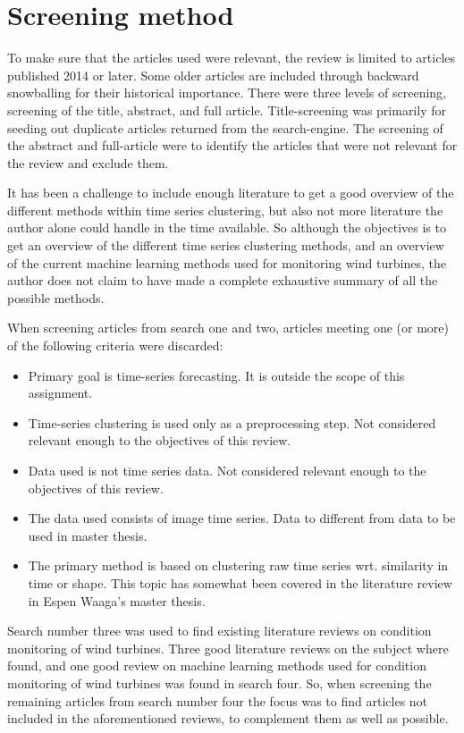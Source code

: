\section{Screening method}
To make sure that the articles used were relevant, the review is limited to articles published 2014 or later. Some older articles are included through backward snowballing for their historical importance. There were three levels of screening, screening of the title, abstract, and full article. Title-screening was primarily for seeding out duplicate articles returned from the search-engine. The screening of the abstract and full-article were to identify the articles that were not relevant for the review and exclude them. \bigskip

It has been a challenge to include enough literature to get a good overview of the different methods within time series clustering, but also not more literature the author alone could handle in the time available. So although the objectives is to get an overview of the different time series clustering methods, and an overview of the current machine learning methods used for monitoring wind turbines, the author does not claim to have made a complete exhaustive summary of all the possible methods. \bigskip

When screening articles from search one and two, articles meeting one (or more) of the following criteria were discarded: 
\begin{itemize}
    \item Primary goal is time-series forecasting. It is outside the scope of this assignment.
    \item Time-series clustering is used only as a preprocessing step. Not considered relevant enough to the objectives of this review.
    \item Data used is not time series data. Not considered relevant enough to the objectives of this review.
    \item The data used consists of image time series. Data to different from data to be used in master thesis.
    \item The primary method is based on clustering raw time series wrt. similarity in time or shape. This topic has somewhat been covered in the literature review in Espen Waaga's master thesis.
\end{itemize}

Search number three was used to find existing literature reviews on condition monitoring of wind turbines. Three good literature reviews on the subject where found, and one good review on machine learning methods used for condition monitoring of wind turbines was found in search four. So, when screening the remaining articles from search number four the focus was to find articles not included in the aforementioned reviews, to complement them as well as possible. \bigskip
